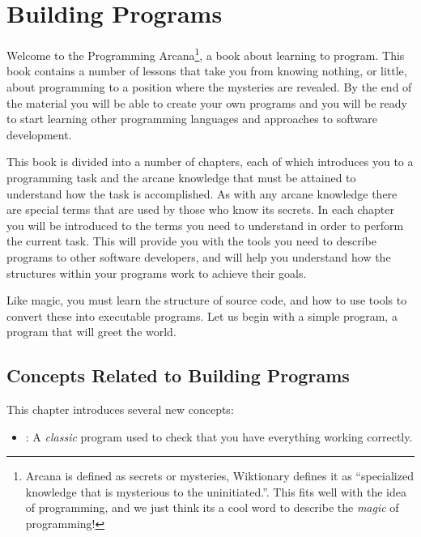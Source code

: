 \chapter{Building Programs} %
\label{cha:building programs}

Welcome to the Programming Arcana\footnote{Arcana is defined as secrets or mysteries, Wiktionary defines it as ``specialized knowledge that is mysterious to the uninitiated.''. This fits well with the idea of programming, and we just think its a cool word to describe the \emph{magic} of programming!}, a book about learning to program. This book contains a number of lessons that take you from knowing nothing, or little, about programming to a position where the mysteries are revealed. By the end of the material you will be able to create your own programs and you will be ready to start learning other programming languages and approaches to software development.

This book is divided into a number of chapters, each of which introduces you to a programming task and the arcane knowledge that must be attained to understand how the task is accomplished. As with any arcane knowledge there are special terms that are used by those who know its secrets. In each chapter you will be introduced to the terms you need to understand in order to perform the current task. This will provide you with the tools you need to describe programs to other software developers, and will help you understand how the structures within your programs work to achieve their goals.

Like magic, you must learn the structure of source code, and how to use tools to convert these into executable programs. Let us begin with a simple program, a program that will greet the world.

\minitoc

\clearpage
\section{Concepts Related to Building Programs} %
\label{sec:concepts_related_to_building_programs}

This chapter introduces several new concepts:
\begin{itemize}
  \item {}: A \emph{classic} program used to check that you have everything working correctly.
\end{itemize}


